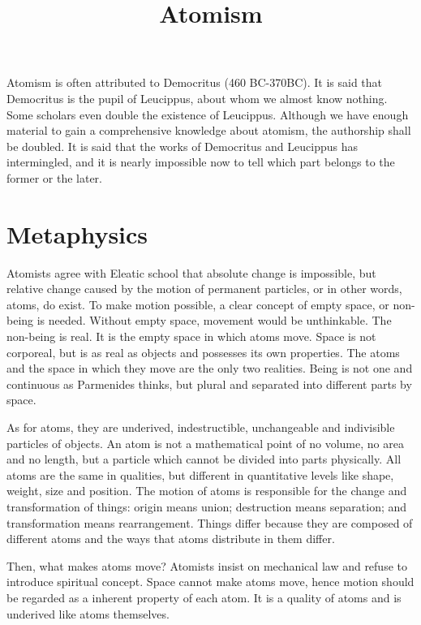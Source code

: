 \documentclass[11pt]{article}
\title{Atomism}
\date{}
\begin{document}
\begin{sloppypar}
  \maketitle

  \linenumbers
Atomism is often attributed to Democritus (460 BC-370BC). 
It is said that Democritus is the pupil of Leucippus, about whom we almost know nothing. 
Some scholars even double the existence of Leucippus. 
Although we have enough material to gain a comprehensive knowledge about atomism, the authorship shall be doubled. 
It is said that the works of Democritus and Leucippus has intermingled, and it is nearly impossible now to tell which part belongs to the former or the later.

\section{Metaphysics} 
Atomists agree with Eleatic school that absolute change is impossible, but relative change caused by the motion of permanent particles, or in other words, atoms, do exist. 
To make motion possible, a clear concept of empty space, or non-being is needed. 
Without empty space, movement would be unthinkable. 
The non-being is real. 
It is the empty space in which atoms move. 
Space is not corporeal, but is as real as objects and possesses its own properties. 
The atoms and the space in which they move are the only two realities. 
Being is not one and continuous as Parmenides thinks, but plural and separated into different parts by space. 

\newline

As for atoms, they are underived, indestructible, unchangeable and indivisible particles of objects. 
An atom is not a mathematical point of no volume, no area and no length, but a particle which cannot be divided into parts physically. 
All atoms are the same in qualities, but different in quantitative levels like shape, weight, size and position. 
The motion of atoms is responsible for the change and transformation of things: 
origin means union; 
destruction means separation; 
and transformation means rearrangement. 
Things differ because they are composed of different atoms and the ways that atoms distribute in them differ.

\newline

Then, what makes atoms move? 
Atomists insist on mechanical law and refuse to introduce spiritual concept. 
Space cannot make atoms move, hence motion should be regarded as a inherent property of each atom. 
It is a quality of atoms and is underived like atoms themselves.
  

\end{sloppypar}
\end{document}
